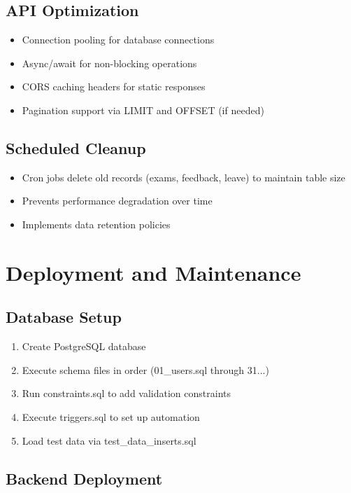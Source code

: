 \documentclass[12pt]{article}
\begin{document}
\subsection{API Optimization}

\begin{itemize}
    \item Connection pooling for database connections
    \item Async/await for non-blocking operations
    \item CORS caching headers for static responses
    \item Pagination support via LIMIT and OFFSET (if needed)
\end{itemize}

\subsection{Scheduled Cleanup}

\begin{itemize}
    \item Cron jobs delete old records (exams, feedback, leave) to maintain table size
    \item Prevents performance degradation over time
    \item Implements data retention policies
\end{itemize}

\newpage

\section{Deployment and Maintenance}

\subsection{Database Setup}

\begin{enumerate}
    \item Create PostgreSQL database
    \item Execute schema files in order (01\_users.sql through 31...)
    \item Run constraints.sql to add validation constraints
    \item Execute triggers.sql to set up automation
    \item Load test data via test\_data\_inserts.sql
\end{enumerate}

\subsection{Backend Deployment}
\end{document}
